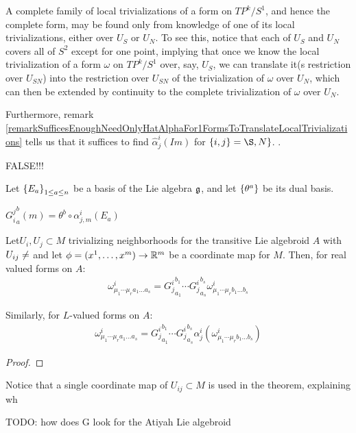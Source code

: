 \begin{example}[$P^k$]
A complete family of local trivializations of a form on $TP^k/S^1$, and hence the complete form, may be found only from knowledge of one of its local trivializations, either over $U_S$ or $U_N$. To see this, notice that each of $U_S$ and $U_N$ covers all of $S^2$ except for one point, implying that once we know the local trivialization of a form $\omega$ on $TP^k/S^1$ over, say, $U_S$, we can translate it(s restriction over $U_{SN}$) into the restriction over $U_{SN}$ of the trivialization of $\omega$ over $U_N$, which can then be extended by continuity to the complete trivialization of $\omega$ over $U_N$. 

Furthermore, remark \ref{remarkSufficesEnoughNeedOnlyHatAlphaFor1FormsToTranslateLocalTrivializations} tells us that it suffices to find $\hat \alpha^i_j(Im)$ for $\{i, j\} = \S, N\}$. .
\end{example}


{\color{gray} FALSE!!!

Let $\left\{ E_a \right\}_{1 \leq a \leq n}$ be a basis of the Lie algebra $\mathfrak{g}$, and let $\left\{ \theta^a \right\}$ be its dual basis.

\begin{definition}
    ${G_i^j}_a^b(m) = \theta^b \circ \alpha^i_{j, m}(E_a)$
\end{definition}

\begin{theorem}
Let$U_i, U_j \subset M$ trivializing neighborhoods for the transitive Lie algebroid $A$ with $U_{ij} \neq \empty$ and let $\phi = (x^1, \dots, x^m) \to \RR^m$ be a coordinate map for $M$. Then, for real valued forms on $A$:
\begin{align}
    \omega^i_{\mu_1 \cdots \mu_r a_1 \dots a_s} = {G^i_j}^{b_1}_{a_1} \cdots {G^i_j}^{b_s}_{a_s} \omega^i_{\mu_1 \cdots \mu_r b_1 \dots b_s}
\end{align}

Similarly, for $L$-valued forms on $A$:
\begin{align}
    \omega^i_{\mu_1 \cdots \mu_r a_1 \dots a_s} = {G^i_j}^{b_1}_{a_1} \cdots {G^i_j}^{b_s}_{a_s} \alpha^i_j(\omega^i_{\mu_1 \cdots \mu_r b_1 \dots b_s})
\end{align}
\end{theorem}
\begin{proof}

\end{proof}
\begin{remark}
Notice that a single coordinate map of $U_{ij} \subset M$ is used in the theorem, explaining wh
\end{remark}

TODO: how does G look for the Atiyah Lie algebroid}
